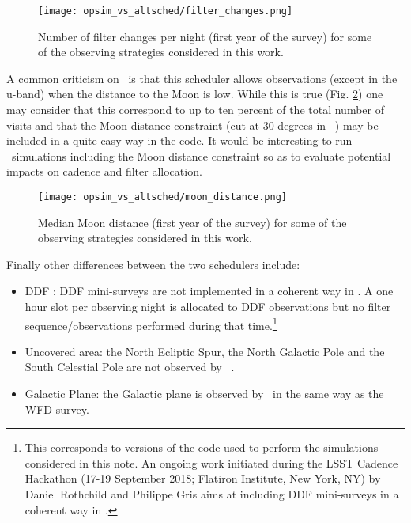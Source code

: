 \begin{figure}[!htbp]
  \begin{center}
    \texttt{[image: opsim\_vs\_altsched/filter\_changes.png]}
    \caption{Number of filter changes per night (first year of the survey) for some of the observing strategies considered in this work.}\label{fig:filter_changes}
    \end{center}
\end{figure}

A common criticism on \altsched~is that this scheduler allows observations (except in the u-band) when the distance to the Moon is low. While this is true (Fig. \ref{fig:moondist}) one may consider that this correspond to up to ten percent of the total number of visits and that the Moon distance constraint (cut at 30 degrees in \opsim~) may be included in a quite easy way in the code. It would be interesting to run \altsched~simulations including the Moon distance constraint so as to evaluate potential impacts on cadence and filter allocation.

\begin{figure}[!htbp]
  \begin{center}
    \texttt{[image: opsim\_vs\_altsched/moon\_distance.png]}
    \caption{Median Moon distance (first year of the survey) for some of the observing strategies considered in this work.}\label{fig:moondist}
    \end{center}
\end{figure}


Finally other differences between the two schedulers include:
\begin{itemize}
\item{DDF} : DDF mini-surveys are not implemented in a coherent way in \altsched. A one hour slot per observing night is allocated to DDF observations but no filter sequence/observations performed during that time.\footnote{This corresponds to versions of the code used to perform the simulations considered in this note. An ongoing work initiated during the LSST Cadence Hackathon (17-19 September 2018; Flatiron Institute, New York, NY) by Daniel Rothchild and Philippe Gris aims at including DDF mini-surveys in a coherent way in \altsched.}
\item{Uncovered area}:  the North Ecliptic Spur, the North Galactic Pole and the South Celestial Pole are not observed by \altsched~.
\item{Galactic Plane}: the Galactic plane is observed by \altsched~in the same way as the WFD survey.

\end{itemize}

